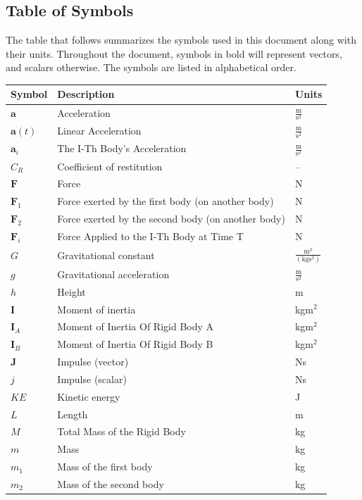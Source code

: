 \documentclass[12pt]{article}
\begin{document}
\subsection{Table of Symbols}
\label{Sec:ToS}
The table that follows summarizes the symbols used in this document along with their units. Throughout the document, symbols in bold will represent vectors, and scalars otherwise. The symbols are listed in alphabetical order.
\begin{longtabu}{l X[l] l}
\toprule
Symbol & Description & Units
\\
\midrule
\endhead
$\mathbf{a}$ & Acceleration & $\frac{\text{m}}{\text{s}^{2}}$
\\
$\mathbf{a}(t)$ & Linear Acceleration & $\frac{\text{m}}{\text{s}^{2}}$
\\
${\mathbf{a}_{i}}$ & The I-Th Body's Acceleration & $\frac{\text{m}}{\text{s}^{2}}$
\\
${C_{R}}$ & Coefficient of restitution & --
\\
$\mathbf{F}$ & Force & N
\\
${\mathbf{F}_{1}}$ & Force exerted by the first body (on another body) & N
\\
${\mathbf{F}_{2}}$ & Force exerted by the second body (on another body) & N
\\
${\mathbf{F}_{i}}$ & Force Applied to the I-Th Body at Time T & N
\\
$G$ & Gravitational constant & $\frac{\text{m}^{3}}{(\text{kg}\text{s}^{2})}$
\\
$g$ & Gravitational acceleration & $\frac{\text{m}}{\text{s}^{2}}$
\\
$h$ & Height & m
\\
$\mathbf{I}$ & Moment of inertia & kg$\text{m}^{2}$
\\
${\mathbf{I}_{A}}$ & Moment of Inertia Of Rigid Body A & kg$\text{m}^{2}$
\\
${\mathbf{I}_{B}}$ & Moment of Inertia Of Rigid Body B & kg$\text{m}^{2}$
\\
$\mathbf{J}$ & Impulse (vector) & Ns
\\
$j$ & Impulse (scalar) & Ns
\\
$KE$ & Kinetic energy & J
\\
$L$ & Length & m
\\
$M$ & Total Mass of the Rigid Body & kg
\\
$m$ & Mass & kg
\\
${m_{1}}$ & Mass of the first body & kg
\\
${m_{2}}$ & Mass of the second body & kg

\end{longtabu}
\end{document}
